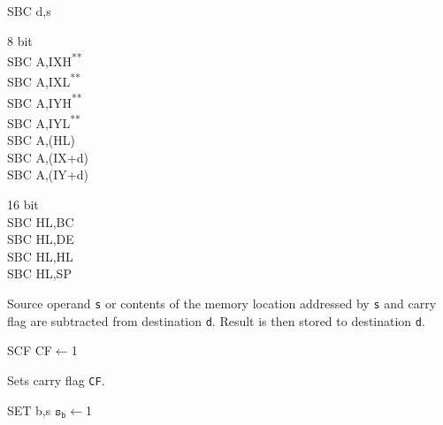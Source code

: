 \documentclass[12pt,twoside,openright,a4paper]{book}
\newcommand{\UNDOC}{\textnormal{\textsuperscript{**}}}
\begin{document}
\begin{basedescript}{
	\desclabelstyle{\multilinelabel}
	\desclabelwidth{3cm}}
\begin{detailitem}{SBC d,s}
\begin{DetailVariants}
			\columnbreak
			\textnormal{8 bit}\\
			SBC A,IXH\UNDOC\\
			SBC A,IXL\UNDOC\\
			SBC A,IYH\UNDOC\\
			SBC A,IYL\UNDOC\\
			SBC A,(HL)\\
			SBC A,(IX+d)\\
			SBC A,(IY+d)

			\columnbreak
			\textnormal{16 bit}\\
			SBC HL,BC\\
			SBC HL,DE\\
			SBC HL,HL\\
			SBC HL,SP
		\end{DetailVariants}
		
		Source operand {\tt s} or contents of the memory location addressed by {\tt s} and carry flag are subtracted from destination {\tt d}. Result is then stored to destination {\tt d}.

		\begin{DetailEffects}[v]
		\end{DetailEffects}
						
		\begin{DetailTiming}
		\end{DetailTiming}

	\end{detailitem}

	\begin{detailitem}{SCF}
		{CF$\leftarrow$1}

		Sets carry flag {\tt CF}.

		\begin{DetailEffects}
			\DetailFlags{\FN}{\FN}{0}{\FN}{0}{1}
		\end{DetailEffects}
						
		\begin{DetailTiming}
			\DetailTime{}{1}{4}
		\end{DetailTiming}

	\end{detailitem}

	\pagebreak
	\begin{detailitem}{SET b,s}
		{$\mathtt{s_b}\leftarrow$1}


\end{detailitem}
\end{basedescript}
\end{document}
